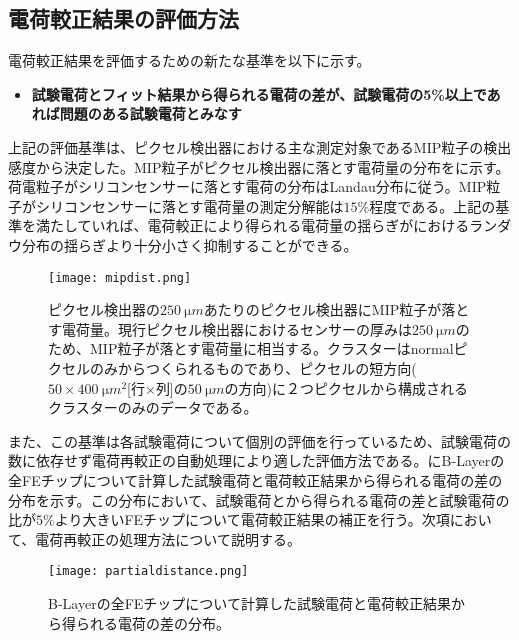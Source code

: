 \subsection{電荷較正結果の評価方法}
電荷較正結果を評価するための新たな基準を以下に示す。
\begin{itemize}
  \item[]\textbf{試験電荷とフィット結果から得られる電荷の差が、試験電荷の5\%以上であれば問題のある試験電荷とみなす}
\end{itemize}
上記の評価基準は、ピクセル検出器における主な測定対象であるMIP粒子の検出感度から決定した。MIP粒子がピクセル検出器に落とす電荷量の分布をに示す。荷電粒子がシリコンセンサーに落とす電荷の分布はLandau分布に従う。MIP粒子がシリコンセンサーに落とす電荷量の測定分解能は$15\%$程度である。上記の基準を満たしていれば、電荷較正により得られる電荷量の揺らぎがにおけるランダウ分布の揺らぎより十分小さく抑制することができる。

\begin{figure}[tbp]
  \centering
  \texttt{[image: mipdist.png]}
  \caption[MIP粒子がピクセル検出器に落とす電荷量]{ピクセル検出器の$250\ \si{\micro m}$あたりのピクセル検出器にMIP粒子が落とす電荷量。現行ピクセル検出器におけるセンサーの厚みは$250\ \si{\micro m}$のため、MIP粒子が落とす電荷量に相当する。クラスターはnormalピクセルのみからつくられるものであり、ピクセルの短方向($50\times400\ \si{\micro m^2}$[行$\times$列]の$50\ \si{\micro m}$の方向)に２つピクセルから構成されるクラスターのみのデータである。}
  \label{fig:mipdist}
\end{figure}


また、この基準は各試験電荷について個別の評価を行っているため、試験電荷の数に依存せず電荷再較正の自動処理により適した評価方法である。にB-Layerの全FEチップについて計算した試験電荷と電荷較正結果から得られる電荷の差の分布を示す。この分布において、試験電荷とから得られる電荷の差と試験電荷の比が$5\% $より大きいFEチップについて電荷較正結果の補正を行う。次項において、電荷再較正の処理方法について説明する。

\begin{figure}[tbp]
  \centering
  \texttt{[image: partialdistance.png]}
  \caption[B-Layerの全FEチップについて計算した試験電荷と電荷較正結果から得られる電荷の差の分布]{B-Layerの全FEチップについて計算した試験電荷と電荷較正結果から得られる電荷の差の分布。}
  \label{fig:partialdistance}
\end{figure}


